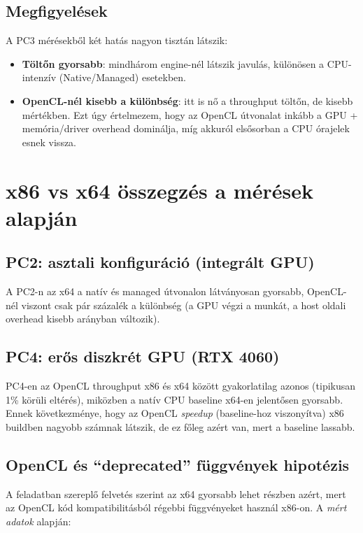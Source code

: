 \subsection{Megfigyelések}

A PC3 mérésekből két hatás nagyon tisztán látszik:

\begin{itemize}
  \item \textbf{Töltőn gyorsabb}: mindhárom engine-nél látszik javulás, különösen a CPU-intenzív (Native/Managed) esetekben.
  \item \textbf{OpenCL-nél kisebb a különbség}: itt is nő a throughput töltőn, de kisebb mértékben.
        Ezt úgy értelmezem, hogy az OpenCL útvonalat inkább a GPU + memória/driver overhead dominálja, míg akkuról elsősorban a CPU órajelek esnek vissza.
\end{itemize}

\section{x86 vs x64 összegzés a mérések alapján}

\subsection{PC2: asztali konfiguráció (integrált GPU)}

A PC2-n az x64 a natív és managed útvonalon látványosan gyorsabb,
OpenCL-nél viszont csak pár százalék a különbség (a GPU végzi a munkát, a host oldali overhead kisebb arányban változik).

\subsection{PC4: erős diszkrét GPU (RTX 4060)}

PC4-en az OpenCL throughput x86 és x64 között gyakorlatilag azonos (tipikusan 1\% körüli eltérés),
miközben a natív CPU baseline x64-en jelentősen gyorsabb.
Ennek következménye, hogy az OpenCL \emph{speedup} (baseline-hoz viszonyítva) x86 buildben nagyobb számnak látszik,
de ez főleg azért van, mert a baseline lassabb.

\subsection{OpenCL és ``deprecated'' függvények hipotézis}

A feladatban szereplő felvetés szerint az x64 gyorsabb lehet részben azért, mert az OpenCL kód
kompatibilitásból régebbi függvényeket használ x86-on. A \emph{mért adatok} alapján:

